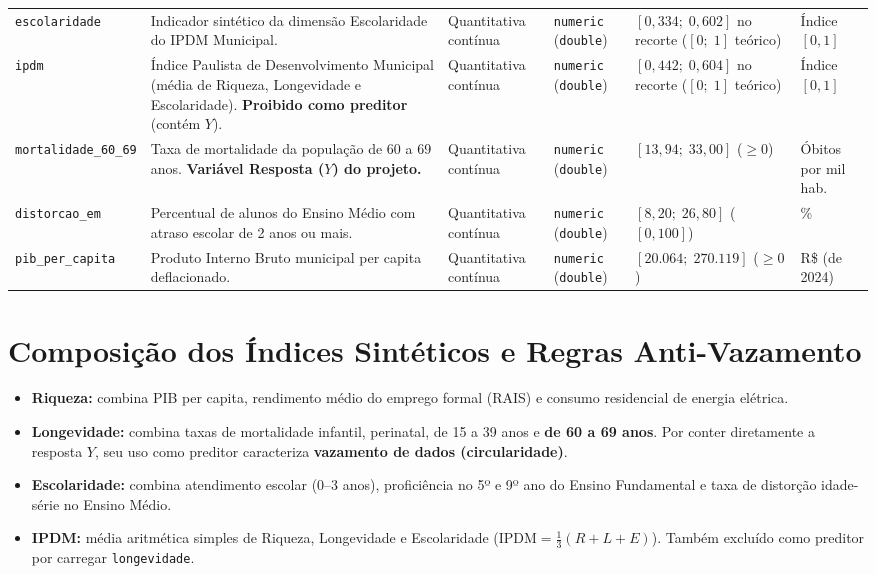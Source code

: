 \documentclass[11pt,a4paper]{article}
\begin{document}
\begin{longtable}{@{}L{2.9cm} L{4.6cm} L{2.4cm} L{1.9cm} L{2.3cm} L{1.5cm}@{}}
\texttt{escolaridade} &
Indicador sintético da dimensão Escolaridade do IPDM Municipal. &
Quantitativa contínua &
\texttt{numeric} (\texttt{double}) &
$[0{,}334;\; 0{,}602]$ no recorte ($[0;\; 1]$ teórico) &
Índice $[0, 1]$ \\
\addlinespace[4pt]

\texttt{ipdm} &
Índice Paulista de Desenvolvimento Municipal (média de Riqueza, Longevidade e Escolaridade). \textbf{Proibido como preditor} (contém $Y$). &
Quantitativa contínua &
\texttt{numeric} (\texttt{double}) &
$[0{,}442;\; 0{,}604]$ no recorte ($[0;\; 1]$ teórico) &
Índice $[0, 1]$ \\
\addlinespace[4pt]

\texttt{mortalidade\_60\_69} &
Taxa de mortalidade da população de 60 a 69 anos. \textbf{Variável Resposta ($Y$) do projeto.} &
Quantitativa contínua &
\texttt{numeric} (\texttt{double}) &
$[13{,}94;\; 33{,}00]$ ($\ge 0$) &
Óbitos por mil hab. \\
\addlinespace[4pt]

\texttt{distorcao\_em} &
Percentual de alunos do Ensino Médio com atraso escolar de 2 anos ou mais. &
Quantitativa contínua &
\texttt{numeric} (\texttt{double}) &
$[8{,}20;\; 26{,}80]$ ($[0, 100]$) &
\% \\
\addlinespace[4pt]

\texttt{pib\_per\_capita} &
Produto Interno Bruto municipal per capita deflacionado. &
Quantitativa contínua &
\texttt{numeric} (\texttt{double}) &
$[20.064;\; 270.119]$ ($\ge 0$) &
R\$ (de 2024) \\

\end{longtable}
\normalsize

\section*{Composição dos Índices Sintéticos e Regras Anti-Vazamento}
\begin{itemize}
  \item \textbf{Riqueza:} combina PIB per capita, rendimento médio do emprego formal (RAIS) e consumo residencial de energia elétrica.
  \item \textbf{Longevidade:} combina taxas de mortalidade infantil, perinatal, de 15 a 39 anos e \textbf{de 60 a 69 anos}. Por conter diretamente a resposta $Y$, seu uso como preditor caracteriza \textbf{vazamento de dados (circularidade)}.
  \item \textbf{Escolaridade:} combina atendimento escolar (0--3 anos), proficiência no 5º e 9º ano do Ensino Fundamental e taxa de distorção idade-série no Ensino Médio.
  \item \textbf{IPDM:} média aritmética simples de Riqueza, Longevidade e Escolaridade ($\text{IPDM} = \frac{1}{3}(R + L + E)$). Também excluído como preditor por carregar \texttt{longevidade}.
\end{itemize}
\end{document}
